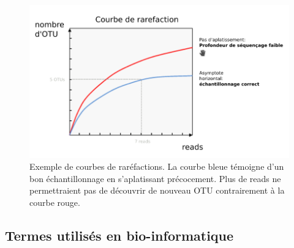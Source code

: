 \documentclass[12pt,a4paper]{article}
\begin{document}
\begin{figure}[ht]
\begin{center}
\includegraphics[scale=0.5]{img/rarefaction_example.png}\hfill
\end{center}
\caption{Exemple de courbes de raréfactions. La courbe bleue témoigne d'un bon échantillonnage en s’aplatissant précocement. Plus de reads ne permettraient pas de découvrir de nouveau OTU contrairement à la courbe rouge. }
\label{rarefaction_demo}
\end{figure}




\subsection{Termes utilisés en bio-informatique}
\end{document}

